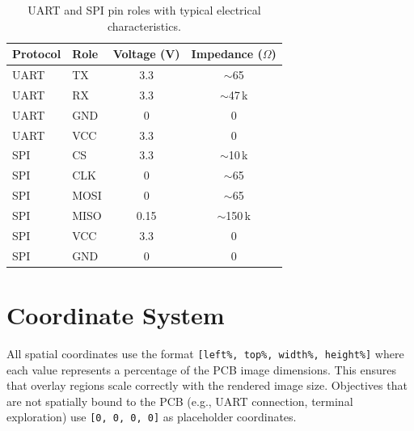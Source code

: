 \begin{table}[H]
\centering
\caption{UART and SPI pin roles with typical electrical characteristics.}
\label{tab:pin-roles}
\begin{tabular}{llcc}
\toprule
\textbf{Protocol} & \textbf{Role} & \textbf{Voltage (V)} & \textbf{Impedance ($\Omega$)} \\
\midrule
UART & TX  & 3.3 & $\sim$65 \\
UART & RX  & 3.3 & $\sim$47\,k \\
UART & GND & 0   & 0 \\
UART & VCC & 3.3 & 0 \\
\midrule
SPI  & CS   & 3.3 & $\sim$10\,k \\
SPI  & CLK  & 0   & $\sim$65 \\
SPI  & MOSI & 0   & $\sim$65 \\
SPI  & MISO & 0.15 & $\sim$150\,k \\
SPI  & VCC  & 3.3 & 0 \\
SPI  & GND  & 0   & 0 \\
\bottomrule
\end{tabular}
\end{table}

\section{Coordinate System}\label{sec:app-coords}

All spatial coordinates use the format \texttt{[left\%, top\%, width\%, height\%]} where each value represents a percentage of the PCB image dimensions. This ensures that overlay regions scale correctly with the rendered image size. Objectives that are not spatially bound to the PCB (e.g., UART connection, terminal exploration) use \texttt{[0, 0, 0, 0]} as placeholder coordinates.
